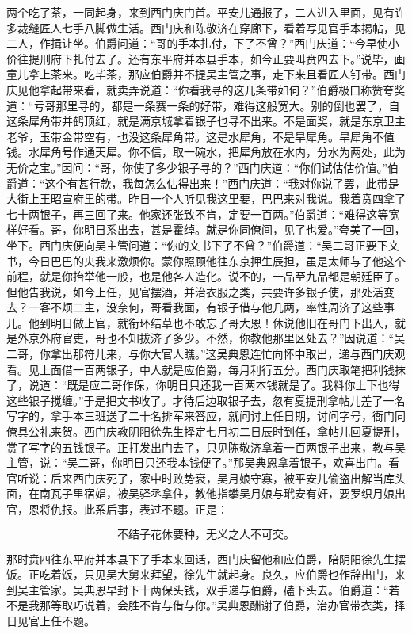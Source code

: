 两个吃了茶，一同起身，来到西门庆门首。平安儿通报了，二人进入里面，见有许多裁缝匠人七手八脚做生活。西门庆和陈敬济在穿廊下，看着写见官手本揭帖，见二人，作揖让坐。伯爵问道：“哥的手本扎付，下了不曾？”西门庆道：“今早使小价往提刑府下扎付去了。还有东平府并本县手本，如今正要叫贲四去下。”说毕，画童儿拿上茶来。吃毕茶，那应伯爵并不提吴主管之事，走下来且看匠人钉带。西门庆见他拿起带来看，就卖弄说道：“你看我寻的这几条带如何？”伯爵极口称赞夸奖道：“亏哥那里寻的，都是一条赛一条的好带，难得这般宽大。别的倒也罢了，自这条犀角带并鹤顶红，就是满京城拿着银子也寻不出来。不是面奖，就是东京卫主老爷，玉带金带空有，也没这条犀角带。这是水犀角，不是旱犀角。旱犀角不值钱。水犀角号作通天犀。你不信，取一碗水，把犀角放在水内，分水为两处，此为无价之宝。”因问：“哥，你使了多少银子寻的？”西门庆道：“你们试估估价值。”伯爵道：“这个有甚行款，我每怎么估得出来！”西门庆道：“我对你说了罢，此带是大街上王昭宣府里的带。昨日一个人听见我这里要，巴巴来对我说。我着贲四拿了七十两银子，再三回了来。他家还张致不肯，定要一百两。”伯爵道：“难得这等宽样好看。哥，你明日系出去，甚是霍绰。就是你同僚间，见了也爱。”夸美了一回，坐下。西门庆便向吴主管问道：“你的文书下了不曾？”伯爵道：“吴二哥正要下文书，今日巴巴的央我来激烦你。蒙你照顾他往东京押生辰担，虽是太师与了他这个前程，就是你抬举他一般，也是他各人造化。说不的，一品至九品都是朝廷臣子。但他告我说，如今上任，见官摆酒，并治衣服之类，共要许多银子使，那处活变去？一客不烦二主，没奈何，哥看我面，有银子借与他几两，率性周济了这些事儿。他到明日做上官，就衔环结草也不敢忘了哥大恩！休说他旧在哥门下出入，就是外京外府官吏，哥也不知拔济了多少。不然，你教他那里区处去？”因说道：“吴二哥，你拿出那符儿来，与你大官人瞧。”这吴典恩连忙向怀中取出，递与西门庆观看。见上面借一百两银子，中人就是应伯爵，每月利行五分。西门庆取笔把利钱抹了，说道：“既是应二哥作保，你明日只还我一百两本钱就是了。我料你上下也得这些银子搅缠。”于是把文书收了。才待后边取银子去，忽有夏提刑拿帖儿差了一名写字的，拿手本三班送了二十名排军来答应，就问讨上任日期，讨问字号，衙门同僚具公礼来贺。西门庆教阴阳徐先生择定七月初二日辰时到任，拿帖儿回夏提刑，赏了写字的五钱银子。正打发出门去了，只见陈敬济拿着一百两银子出来，教与吴主管，说：“吴二哥，你明日只还我本钱便了。”那吴典恩拿着银子，欢喜出门。看官听说：后来西门庆死了，家中时败势衰，吴月娘守寡，被平安儿偷盗出解当库头面，在南瓦子里宿娼，被吴驿丞拿住，教他指攀吴月娘与玳安有奸，要罗织月娘出官，恩将仇报。此系后事，表过不题。正是：

\[
不结子花休要种，无义之人不可交。
\]

那时贲四往东平府并本县下了手本来回话，西门庆留他和应伯爵，陪阴阳徐先生摆饭。正吃着饭，只见吴大舅来拜望，徐先生就起身。良久，应伯爵也作辞出门，来到吴主管家。吴典恩早封下十两保头钱，双手递与伯爵，磕下头去。伯爵道：“若不是我那等取巧说着，会胜不肯与借与你。”吴典恩酬谢了伯爵，治办官带衣类，择日见官上任不题。

